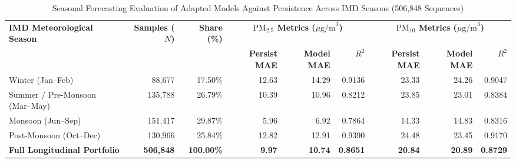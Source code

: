\begin{table}[t]
\caption{Seasonal Forecasting Evaluation of Adapted Models Against Persistence Across IMD Seasons (506,848 Sequences)}
\label{tab:seasonal_metrics}
\centering
\small
\begin{tabular}{lrrrrrrrr}
\toprule
\textbf{IMD Meteorological Season} & \textbf{Samples ($N$)} & \textbf{Share (\%)} & \multicolumn{3}{c}{\textbf{$\text{PM}_{2.5}$ Metrics ($\mu\text{g/m}^3$)}} & \multicolumn{3}{c}{\textbf{$\text{PM}_{10}$ Metrics ($\mu\text{g/m}^3$)}} \\
\cmidrule(lr){4-6} \cmidrule(lr){7-9}
& & & \textbf{Persist MAE} & \textbf{Model MAE} & \textbf{$R^2$} & \textbf{Persist MAE} & \textbf{Model MAE} & \textbf{$R^2$} \\
\midrule
Winter (Jan--Feb) & 88,677 & 17.50\% & 12.63 & 14.29 & 0.9136 & 23.33 & 24.26 & 0.9047 \\
Summer / Pre-Monsoon (Mar--May) & 135,788 & 26.79\% & 10.39 & 10.96 & 0.8212 & 23.85 & 23.01 & 0.8384 \\
Monsoon (Jun--Sep) & 151,417 & 29.87\% & 5.96 & 6.92 & 0.7864 & 14.33 & 14.83 & 0.8316 \\
Post-Monsoon (Oct--Dec) & 130,966 & 25.84\% & 12.82 & 12.91 & 0.9390 & 24.48 & 23.45 & 0.9170 \\
\midrule
\textbf{Full Longitudinal Portfolio} & \textbf{506,848} & \textbf{100.00\%} & \textbf{9.97} & \textbf{10.74} & \textbf{0.8651} & \textbf{20.84} & \textbf{20.89} & \textbf{0.8729} \\
\bottomrule
\end{tabular}
\end{table}
